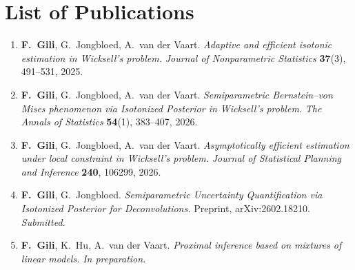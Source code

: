 \chapter*{List of Publications}
\label{publications}

\begin{enumerate}

  \item \textbf{F.~Gili}, G.~Jongbloed, A.~van der Vaart.
    \textit{Adaptive and efficient isotonic estimation in Wicksell's problem.}
    \textit{Journal of Nonparametric Statistics} \textbf{37}(3), 491--531, 2025.

  \item \textbf{F.~Gili}, G.~Jongbloed, A.~van der Vaart.
    \textit{Semiparametric Bernstein--von Mises phenomenon via Isotonized Posterior in Wicksell's problem.}
    \textit{The Annals of Statistics} \textbf{54}(1), 383--407, 2026.

  \item \textbf{F.~Gili}, G.~Jongbloed, A.~van der Vaart.
    \textit{Asymptotically efficient estimation under local constraint in Wicksell's problem.}
    \textit{Journal of Statistical Planning and Inference} \textbf{240}, 106299, 2026.

  \item \textbf{F.~Gili}, G.~Jongbloed.
    \textit{Semiparametric Uncertainty Quantification via Isotonized Posterior for Deconvolutions.}
    Preprint, arXiv:2602.18210. \textit{Submitted.}

  \item \textbf{F.~Gili}, K.~Hu, A.~van der Vaart.
    \textit{Proximal inference based on mixtures of linear models.}
    \textit{In preparation.}

\end{enumerate}
